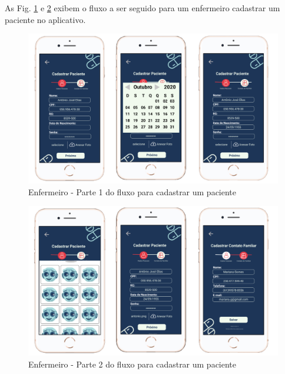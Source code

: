 As Fig. \ref{fig:prototipo_enfermeiro_cadastroPaciente_1} e \ref{fig:prototipo_enfermeiro_cadastroPaciente_2} exibem o fluxo a ser seguido para um enfermeiro cadastrar um paciente no aplicativo.

\begin{figure}[H]
    \centering
    \includegraphics[width=15cm]{figuras/software/Atual_prototipo/Enfermeiro_cadastroPaciente_1.png}
    \caption{Enfermeiro - Parte 1 do fluxo para cadastrar um paciente}
    \label{fig:prototipo_enfermeiro_cadastroPaciente_1}
\end{figure}

\begin{figure}[H]
    \centering
    \includegraphics[width=15cm]{figuras/software/Atual_prototipo/Enfermeiro_cadastroPaciente_2.png}
    \caption{Enfermeiro - Parte 2 do fluxo para cadastrar um paciente}
    \label{fig:prototipo_enfermeiro_cadastroPaciente_2}
\end{figure}


